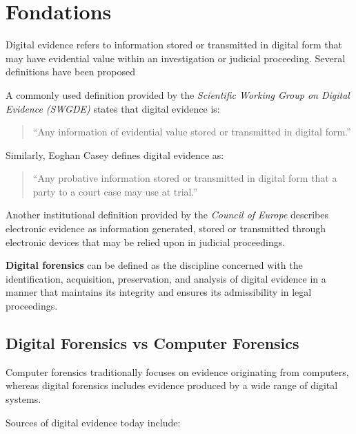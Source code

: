 \section{Fondations}

Digital evidence refers to information stored or transmitted in digital form that may have evidential value within an investigation or judicial proceeding. Several definitions have been proposed

\medskip

\noindent
A commonly used definition provided by the \textit{Scientific Working Group on Digital Evidence (SWGDE)} states that digital evidence is:

\begin{quote}
\small
``Any information of evidential value stored or transmitted in digital form.''
\end{quote}

\medskip

\noindent
Similarly, Eoghan Casey defines digital evidence as:

\begin{quote}
\small
``Any probative information stored or transmitted in digital form that a party to a court case may use at trial.''
\end{quote}

\medskip

\noindent
Another institutional definition provided by the \textit{Council of Europe} describes electronic evidence as information generated, stored or transmitted through electronic devices that may be relied upon in judicial proceedings.
\bigskip

\noindent
\textbf{Digital forensics} can be defined as the discipline concerned with the identification, acquisition, preservation, and analysis of digital evidence in a manner that maintains its integrity and ensures its admissibility in legal proceedings.

\subsection{Digital Forensics vs Computer Forensics}

Computer forensics traditionally focuses on evidence originating from computers, whereas digital forensics includes evidence produced by a wide range of digital systems.

\medskip

\noindent
Sources of digital evidence today include:

